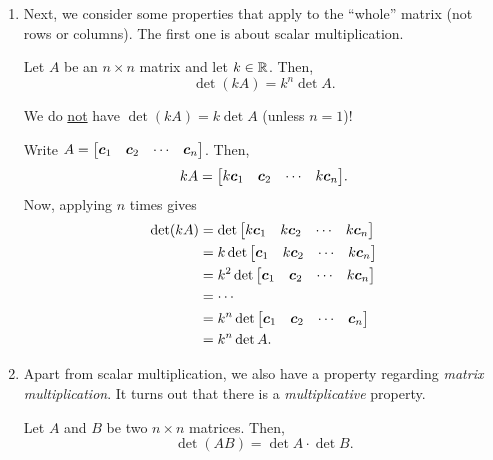 \begin{enumerate}
\item Next, we consider some properties that apply to the ``whole'' matrix (not
rows or columns). The first one is about scalar multiplication.
\begin{proposition}
\label{prp:det-scalar-mult}
Let \(A\) be an \(n\times n\) matrix and let \(k\in\mathbb{R}\). Then,
\[
\det(kA)=k^n\det A.
\]
\begin{warning}
We do \underline{not} have \(\det(kA)=k\det A\) (unless \(n=1\))!
\end{warning}
\end{proposition}
\begin{pf}
Write \(A=\mqty[\vect{c}_{1}&\vect{c}_{2}&\cdots&\vect{c}_{n}]\). Then,
\[
kA=\mqty[k\vect{c}_{1}&\vect{c}_{2}&\cdots&k\vect{c}_{n}].
\]
Now, applying  \(n\) times gives
\begin{align*}
\det(kA)&=\det\mqty[k\vect{c}_{1}&k\vect{c}_{2}&\cdots&k\vect{c}_{n}]\\
&=k\det\mqty[\vect{c}_{1}&k\vect{c}_{2}&\cdots&k\vect{c}_{n}]\\
&=k^{2}\det\mqty[\vect{c}_{1}&\vect{c}_{2}&\cdots&k\vect{c}_{n}]\\
&=\dotsb\\
&=k^n\det\mqty[\vect{c}_{1}&\vect{c}_{2}&\cdots&\vect{c}_{n}]\\
&=k^n\det A.
\end{align*}
\end{pf}

\item Apart from scalar multiplication, we also have a property regarding
\emph{matrix multiplication}. It turns out that there is a
\emph{multiplicative} property.
\begin{proposition}[Multiplicative]
\label{prp:det-multiplicative}
Let \(A\) and \(B\) be two \(n\times n\) matrices. Then,
\[
\det(AB)=\det A\cdot \det B.
\]
\end{proposition}


\end{enumerate}
